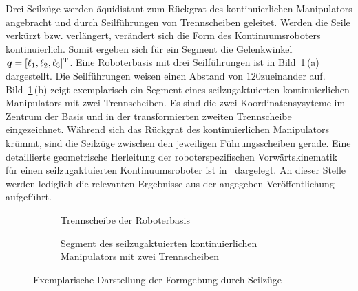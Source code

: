 Drei Seilzüge werden äquidistant zum Rückgrat des kontinuierlichen Manipulators angebracht und durch Seilführungen von Trennscheiben geleitet. Werden die Seile verkürzt bzw. verlängert, verändert sich die Form des Kontinuumsroboters kontinuierlich. Somit ergeben sich für ein Segment die Gelenkwinkel~$\bm{q} = [\ell_1, \ell_2, \ell_3]^{\mathrm{T}}$. Eine Roboterbasis mit drei Seilführungen ist in Bild~\ref{fig:roboterDesign}\,(a) dargestellt. Die Seilführungen weisen einen Abstand von $120$\degree zueinander auf. 
Bild~\ref{fig:roboterDesign}\,(b) zeigt exemplarisch ein Segment eines seilzugaktuierten kontinuierlichen Manipulators mit zwei Trennscheiben. Es sind die zwei Koordinatensysyteme im Zentrum der Basis und in der transformierten zweiten Trennscheibe eingezeichnet. Während sich das Rückgrat des kontinuierlichen Manipulators krümmt, sind die Seilzüge zwischen den jeweiligen Führungsscheiben gerade.
Eine detaillierte geometrische Herleitung der roboterspezifischen Vorwärtskinematik für einen seilzugaktuierten Kontinuumsroboter ist in~\cite{JW06} dargelegt. An dieser Stelle werden lediglich die relevanten Ergebnisse aus der angegeben Veröffentlichung aufgeführt. 

\newsavebox{\imagebox} 
\begin{figure}[htb!]
\begin{subfigure}[t]{0.48\textwidth}
\centering\raisebox{\dimexpr.5\ht\imagebox-.5\height}{
	\def\svgwidth{\textwidth}
	
}
\caption{Trennscheibe der Roboterbasis}
\end{subfigure}
\begin{subfigure}[t]{0.48\textwidth}
\centering
\def\svgwidth{\textwidth}

\caption{Segment des seilzugaktuierten kontinuierlichen Manipulators mit zwei Trennscheiben}
\end{subfigure}
\caption[Exemplarische Darstellung der Formgebung durch Seilzüge]{Exemplarische Darstellung der Formgebung durch Seilzüge}
\label{fig:roboterDesign}
\end{figure}

